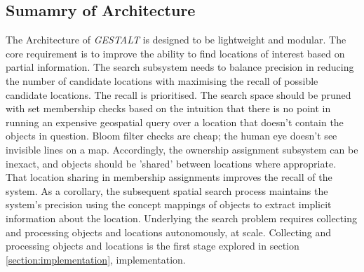 \subsection{Sumamry of Architecture}
The Architecture of \textit{GESTALT} is designed to be lightweight and modular. The core requirement is to improve the ability to find locations of interest based on partial information. 
The search subsystem needs to balance precision in reducing the number of candidate locations with maximising the recall of possible candidate locations. The recall is prioritised. 
The search space should be pruned with set membership checks based on the intuition that there is no point in running an expensive geospatial query over a location that doesn't contain the objects in question. 
Bloom filter checks are cheap; the human eye doesn't see invisible lines on a map. Accordingly, the ownership assignment subsystem can be inexact, and objects should be 'shared' between locations where appropriate. 
That location sharing in membership assignments improves the recall of the system. As a corollary, the subsequent spatial search process maintains the system's precision using the concept mappings of objects to extract implicit information about the location. 
Underlying the search problem requires collecting and processing objects and locations autonomously, at scale. Collecting and processing objects and locations is the first stage explored in section \ref{section:implementation}, implementation. 

